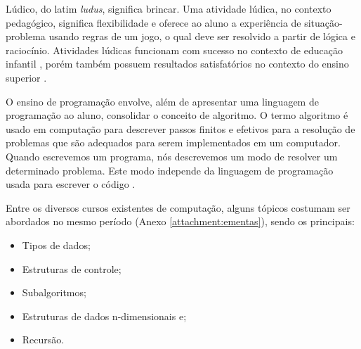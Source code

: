 


Lúdico, do latim \emph{ludus}, significa brincar. Uma atividade lúdica, no contexto pedagógico, significa flexibilidade e oferece ao aluno a experiência de situação-problema usando regras de um jogo, o qual deve ser resolvido a partir de lógica e raciocínio. Atividades lúdicas funcionam com sucesso no contexto de educação infantil \cite{ludico}, porém também possuem resultados satisfatórios no contexto do ensino superior \cite{ludicoalgoritmo}.

O ensino de programação envolve, além de apresentar uma linguagem de programação ao aluno, consolidar o conceito de algoritmo. O termo algoritmo é usado em computação para descrever passos finitos e efetivos para a resolução de problemas que são adequados para serem implementados em um computador. Quando escrevemos um programa, nós descrevemos um modo de resolver um determinado problema. Este modo independe da linguagem de programação usada para escrever o código \cite{algoritmos}.

Entre os diversos cursos existentes de computação, alguns tópicos costumam ser abordados no mesmo período (Anexo \ref{attachment:ementas}), sendo os principais:
\begin{itemize}
  \item Tipos de dados;
  \item Estruturas de controle;
  \item Subalgoritmos;
  \item Estruturas de dados n-dimensionais e;
  \item Recursão.
\end{itemize}

